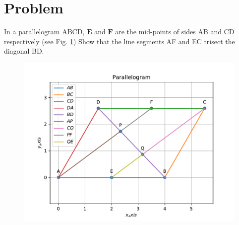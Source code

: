 \documentclass[10pt, a4paper]{article}
\title{\mytitle}
\author{\myauthor\hspace{1em}\\\contact\\FWC22012\hspace{6.5em}IITH\hspace{0.5em}\mymodule\hspace{6em}ASSIGN-5}
\date{}
\let\vec\mathbf
\begin{document}
	\maketitle
	\tableofcontents
   \section{Problem}
   \fi
 In a parallelogram ABCD, $\vec{E}$ and $\vec{F}$ are the
mid-points of sides AB and CD respectively
(see Fig. 
		\ref{fig:9/8/2/5})
Show that the line segments AF
and EC trisect the diagonal BD.

 	\begin{figure}
		\centering
 \includegraphics[width=\columnwidth]{chapters/9/8/2/5/figs/line_1.pdf}
		\caption{}
		\label{fig:9/8/2/5}
  	\end{figure}

	\iffalse
\end{document}
